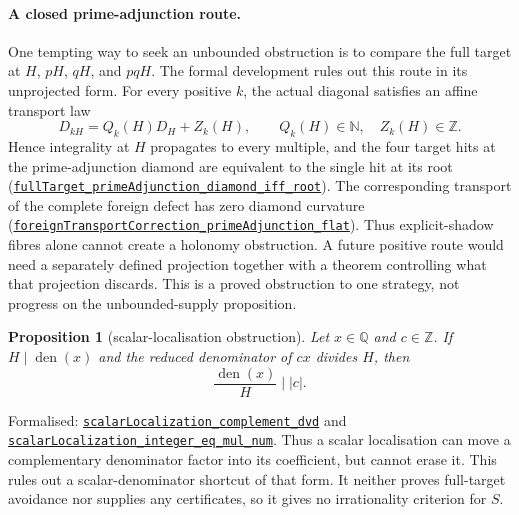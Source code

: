 \documentclass[11pt]{article}
\newcommand{\commit}{81150c1c6fdd4cd51e76d3aa0de344341e0e9e7c}
\newcommand{\repobase}{https://github.com/wcook04/plectis-lean-erdos249-257/blob/\commit}
\newcommand{\PK}{Erdos249257}
\newcommand{\lref}[3]{\href{\repobase/\PK/#1\#L#2}{\nolinkurl{#3}}}
\newcommand{\lrefx}[3]{\href{\repobase/\PK/#1\#L#2}{\nolinkurl{#3}}}
\newtheorem{proposition}[theorem]{Proposition}
\theoremstyle{definition}
\theoremstyle{remark}
\newcommand{\N}{\mathbb{N}}
\newcommand{\Z}{\mathbb{Z}}
\newcommand{\Q}{\mathbb{Q}}
\begin{document}
\paragraph{A closed prime-adjunction route.} One tempting way to seek an
unbounded obstruction is to compare the full target at $H$, $pH$, $qH$, and
$pqH$.  The formal development rules out this route in its unprojected form.
For every positive $k$, the actual diagonal satisfies an affine transport law
\[
 D_{kH}=Q_k(H)D_H+Z_k(H),
 \qquad Q_k(H)\in\N,\quad Z_k(H)\in\Z.
\]
Hence integrality at $H$ propagates to every multiple, and the four target hits
at the prime-adjunction diamond are equivalent to the single hit at its root
(\lref{FullTargetPrimeAdjunctionNoGo.lean}{196}{fullTarget_primeAdjunction_diamond_iff_root}).
The corresponding transport of the complete foreign defect has zero diamond
curvature
(\lrefx{FullTargetPrimeAdjunctionNoGo.lean}{247}{foreignTransportCorrection_primeAdjunction_flat}).
Thus explicit-shadow fibres alone cannot create a holonomy obstruction.  A
future positive route would need a separately defined projection together with
a theorem controlling what that projection discards.  This is a proved
obstruction to one strategy, not progress on the unbounded-supply proposition.

\begin{proposition}[scalar-localisation obstruction]\label{res:adelic}
Let $x\in\Q$ and $c\in\Z$.  If $H\mid\operatorname{den}(x)$ and the reduced denominator
of $cx$ divides $H$, then
\[
 \frac{\operatorname{den}(x)}{H}\mid |c|.
\]
\end{proposition}
\noindent Formalised:
\lrefx{AdelicHeightObstruction.lean}{23}{scalarLocalization_complement_dvd}
and \lrefx{AdelicHeightObstruction.lean}{56}{scalarLocalization_integer_eq_mul_num}.
Thus a scalar localisation can move a complementary denominator factor into
its coefficient, but cannot erase it.  This rules out a scalar-denominator
shortcut of that form.  It neither proves full-target avoidance nor supplies
any certificates, so it gives no irrationality criterion for $S$.
\end{document}
